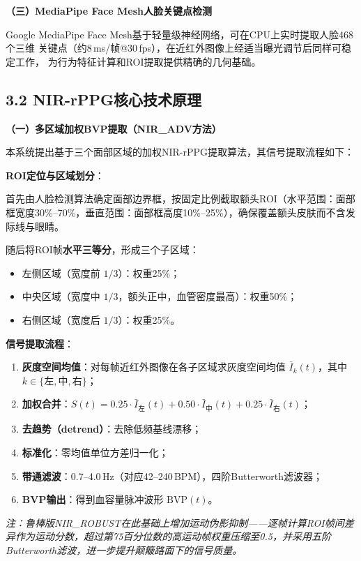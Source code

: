 \documentclass[a4paper,12pt]{article}
\begin{document}
\textbf{（三）MediaPipe Face Mesh人脸关键点检测}

Google MediaPipe Face Mesh基于轻量级神经网络，可在CPU上实时提取人脸468个三维
关键点（约8\,ms/帧@30\,fps），在近红外图像上经适当曝光调节后同样可稳定工作，
为行为特征计算和ROI提取提供精确的几何基础。

\subsection*{3.2 NIR-rPPG核心技术原理}

\textbf{（一）多区域加权BVP提取（NIR\_ADV方法）}

本系统提出基于三个面部区域的加权NIR-rPPG提取算法，其信号提取流程如下：

\vspace{0.5em}
\textbf{ROI定位与区域划分}：

首先由人脸检测算法确定面部边界框，按固定比例截取额头ROI（水平范围：面部框宽度30\%--70\%，垂直范围：面部框高度10\%--25\%），确保覆盖额头皮肤而不含发际线与眼睛。

随后将ROI帧\textbf{水平三等分}，形成三个子区域：
\begin{itemize}[leftmargin=2em, itemsep=1pt]
  \item 左侧区域（宽度前 $1/3$）：权重25\%；
  \item 中央区域（宽度中 $1/3$，额头正中，血管密度最高）：权重50\%；
  \item 右侧区域（宽度后 $1/3$）：权重25\%。
\end{itemize}

\textbf{信号提取流程}：
\begin{enumerate}[leftmargin=2em, itemsep=2pt]
  \item \textbf{灰度空间均值}：对每帧近红外图像在各子区域求灰度空间均值 $\bar{I}_k(t)$，其中 $k\in\{\text{左},\text{中},\text{右}\}$；
  \item \textbf{加权合并}：$S(t) = 0.25\cdot\bar{I}_{左}(t) + 0.50\cdot\bar{I}_{中}(t) + 0.25\cdot\bar{I}_{右}(t)$；
  \item \textbf{去趋势（detrend）}：去除低频基线漂移；
  \item \textbf{标准化}：零均值单位方差归一化；
  \item \textbf{带通滤波}：0.7--4.0\,Hz（对应42--240\,BPM），四阶Butterworth滤波器；
  \item \textbf{BVP输出}：得到血容量脉冲波形 $\text{BVP}(t)$。
\end{enumerate}

\textit{注：鲁棒版NIR\_ROBUST在此基础上增加运动伪影抑制——逐帧计算ROI帧间差异作为运动分数，超过第75百分位数的高运动帧权重压缩至0.5，并采用五阶Butterworth滤波，进一步提升颠簸路面下的信号质量。}
\end{document}
